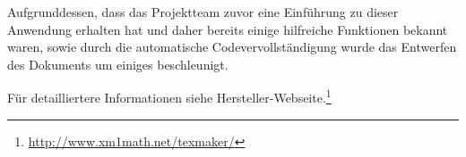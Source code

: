 Aufgrunddessen, dass das Projektteam zuvor eine Einführung zu dieser Anwendung erhalten hat und daher bereits einige hilfreiche Funktionen bekannt waren, sowie durch die automatische Codevervollständigung wurde das Entwerfen des Dokuments um einiges beschleunigt.

Für detailliertere Informationen siehe Hersteller-Webseite.\footnote{\url{http://www.xm1math.net/texmaker/}} \\

